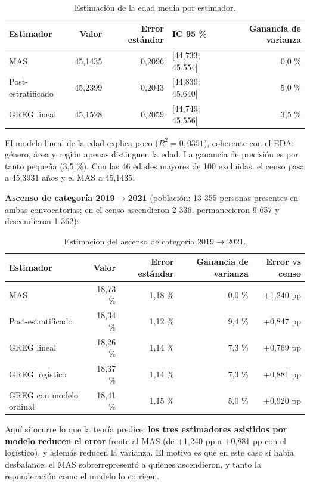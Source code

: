\begin{table}[H]
  \centering
  \small
  \caption{Estimación de la edad media por estimador.}
  \label{tab:mues-edad}
  \begin{tabular}{@{}lrrlr@{}}
    \toprule
    \textbf{Estimador} & \textbf{Valor} & \textbf{Error estándar}
      & \textbf{IC 95 \%} & \textbf{Ganancia de varianza} \\
    \midrule
    MAS & 45,1435 & 0,2096 & [44,733; 45,554] & 0,0 \% \\
    Post-estratificado & 45,2399 & 0,2043 & [44,839; 45,640] & 5,0 \% \\
    GREG lineal & 45,1528 & 0,2059 & [44,749; 45,556] & 3,5 \% \\
    \bottomrule
  \end{tabular}
\end{table}

El modelo lineal de la edad explica poco ($R^2 = 0{,}0351$), coherente con el
EDA: género, área y región apenas distinguen la edad. La ganancia de precisión es
por tanto pequeña (3,5 \%). Con las 46 edades mayores de 100 excluidas, el censo
pasa a 45,3931 años y el MAS a 45,1435.

\textbf{Ascenso de categoría 2019$\rightarrow$2021} (población: 13 355 personas
presentes en ambas convocatorias; en el censo ascendieron 2 336, permanecieron
9 657 y descendieron 1 362):

\begin{table}[H]
  \centering
  \small
  \caption{Estimación del ascenso de categoría 2019$\rightarrow$2021.}
  \label{tab:mues-ascenso}
  \begin{tabular}{@{}lrrrr@{}}
    \toprule
    \textbf{Estimador} & \textbf{Valor} & \textbf{Error estándar}
      & \textbf{Ganancia de varianza} & \textbf{Error vs censo} \\
    \midrule
    MAS & 18,73 \% & 1,18 \% & 0,0 \% & +1,240 pp \\
    Post-estratificado & 18,34 \% & 1,12 \% & 9,4 \% & +0,847 pp \\
    GREG lineal & 18,26 \% & 1,14 \% & 7,3 \% & +0,769 pp \\
    GREG logístico & 18,37 \% & 1,14 \% & 7,3 \% & +0,881 pp \\
    GREG con modelo ordinal & 18,41 \% & 1,15 \% & 5,0 \% & +0,920 pp \\
    \bottomrule
  \end{tabular}
\end{table}

Aquí sí ocurre lo que la teoría predice: \textbf{los tres estimadores asistidos
por modelo reducen el error} frente al MAS (de +1,240 pp a +0,881 pp con el
logístico), y además reducen la varianza. El motivo es que en este caso sí había
desbalance: el MAS sobrerrepresentó a quienes ascendieron, y tanto la
reponderación como el modelo lo corrigen.

